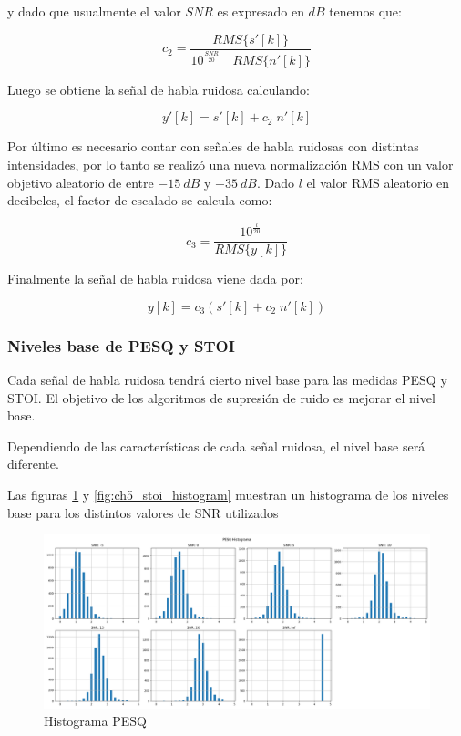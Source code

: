 y dado que usualmente el valor $SNR$ es expresado en $\si{dB}$ tenemos que:

\begin{equation*}
	c_2 = \frac{RMS\{s'[k]\}}{10^{\frac{SNR}{20}} \quad RMS\{n'[k]\}}
\end{equation*}

Luego se obtiene la señal de habla ruidosa calculando:

\begin{equation*}
	y'[k] = s'[k] + c_2 \; n'[k]
\end{equation*}

Por último es necesario contar con señales de habla ruidosas con distintas intensidades, por lo tanto se realizó una nueva normalización RMS con un valor objetivo aleatorio de entre $\SI{-15}{dB}$ y $\SI{-35}{dB}$. Dado $l$ el valor RMS aleatorio en decibeles, el factor de escalado se calcula como:

\begin{equation*}
	c_3 = \frac{10^{\frac{l}{20}}}{RMS\{y[k]\}}
\end{equation*}

Finalmente la señal de habla ruidosa viene dada por:

\begin{equation*}
	y[k] = c_3 \left( s'[k] + c_2 \; n'[k] \right)
\end{equation*}

\subsubsection{Niveles base de PESQ y STOI}

Cada señal de habla ruidosa tendrá cierto nivel base para las medidas PESQ y STOI. El objetivo de los algoritmos de supresión de ruido es mejorar el nivel base.

Dependiendo de las características de cada señal ruidosa, el nivel base será diferente.

Las figuras \ref{fig:ch5_pesq_histogram} y \ref{fig:ch5_stoi_histogram} muestran un histograma de los niveles base para los distintos valores de SNR utilizados

\begin{figure}[H]
	\centering
	\centerline{\includegraphics[scale=0.35]{images/ch5/pesq_aggregated.png}}
	\caption{Histograma PESQ}
	\label{fig:ch5_pesq_histogram}
\end{figure}

